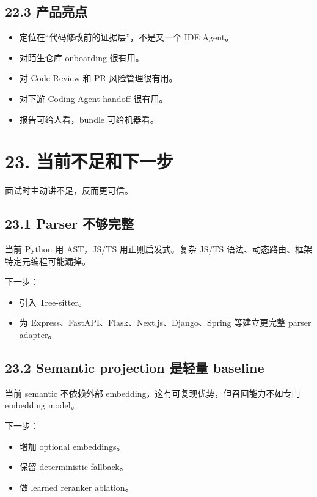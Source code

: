 \documentclass[UTF8,12pt,openany]{ctexbook}
\begin{document}
\subsection{22.3 产品亮点}

\begin{itemize}
\item 定位在“代码修改前的证据层”，不是又一个 IDE Agent。
\item 对陌生仓库 onboarding 很有用。
\item 对 Code Review 和 PR 风险管理很有用。
\item 对下游 Coding Agent handoff 很有用。
\item 报告可给人看，bundle 可给机器看。
\end{itemize}

\section{23. 当前不足和下一步}

面试时主动讲不足，反而更可信。\par

\subsection{23.1 Parser 不够完整}

当前 Python 用 AST，JS/TS 用正则启发式。复杂 JS/TS 语法、动态路由、框架特定元编程可能漏掉。\par

下一步：\par

\begin{itemize}
\item 引入 Tree-sitter。
\item 为 Express、FastAPI、Flask、Next.js、Django、Spring 等建立更完整 parser adapter。
\end{itemize}

\subsection{23.2 Semantic projection 是轻量 baseline}

当前 semantic 不依赖外部 embedding，这有可复现优势，但召回能力不如专门 embedding model。\par

下一步：\par

\begin{itemize}
\item 增加 optional embeddings。
\item 保留 deterministic fallback。
\item 做 learned reranker ablation。
\end{itemize}
\end{document}

